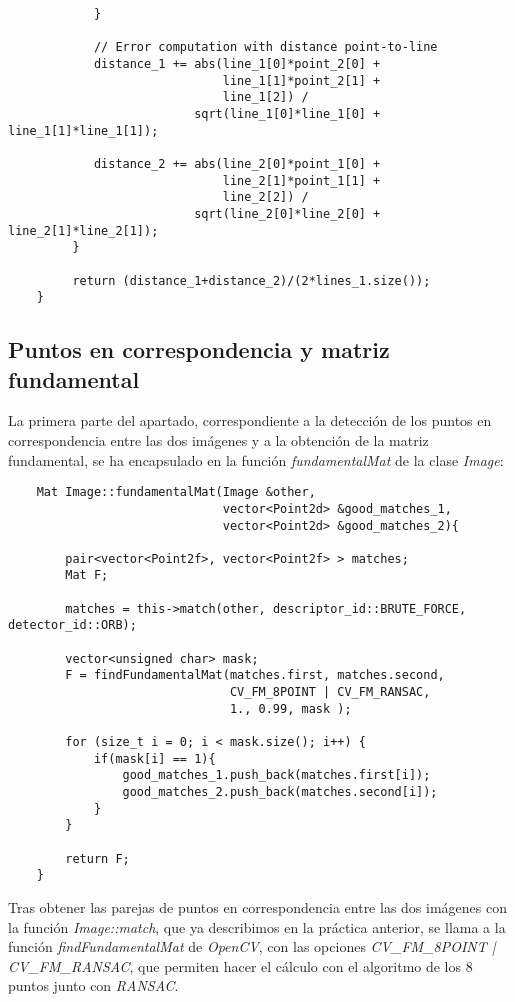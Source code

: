 \documentclass[a4paper, 11pt]{article}
\theoremstyle{definition}
\theoremstyle{theorem}
\begin{document}
\begin{lstlisting}
            }

            // Error computation with distance point-to-line
            distance_1 += abs(line_1[0]*point_2[0] +
                              line_1[1]*point_2[1] +
                              line_1[2]) /
                          sqrt(line_1[0]*line_1[0] + line_1[1]*line_1[1]);

            distance_2 += abs(line_2[0]*point_1[0] +
                              line_2[1]*point_1[1] +
                              line_2[2]) /
                          sqrt(line_2[0]*line_2[0] + line_2[1]*line_2[1]);
         }

         return (distance_1+distance_2)/(2*lines_1.size());
    }
    \end{lstlisting}

    \subsection{Puntos en correspondencia y matriz fundamental}
    La primera parte del apartado, correspondiente a la detección de los puntos en correspondencia entre las dos imágenes y a la obtención de la matriz fundamental, se ha encapsulado en la función \emph{fundamentalMat} de la clase \emph{Image}:

    \begin{lstlisting}
    Mat Image::fundamentalMat(Image &other,
                              vector<Point2d> &good_matches_1,
                              vector<Point2d> &good_matches_2){

        pair<vector<Point2f>, vector<Point2f> > matches;
        Mat F;

        matches = this->match(other, descriptor_id::BRUTE_FORCE, detector_id::ORB);

        vector<unsigned char> mask;
        F = findFundamentalMat(matches.first, matches.second,
                               CV_FM_8POINT | CV_FM_RANSAC,
                               1., 0.99, mask );

        for (size_t i = 0; i < mask.size(); i++) {
            if(mask[i] == 1){
                good_matches_1.push_back(matches.first[i]);
                good_matches_2.push_back(matches.second[i]);
            }
        }

        return F;
    }
    \end{lstlisting}

    Tras obtener las parejas de puntos en correspondencia entre las dos imágenes con la función \emph{Image::match}, que ya describimos en la práctica anterior, se llama a la función \emph{findFundamentalMat} de \emph{OpenCV}, con las opciones \emph{CV\_FM\_8POINT | CV\_FM\_RANSAC}, que permiten hacer el cálculo con el algoritmo de los 8 puntos junto con \emph{RANSAC}.
\end{document}

